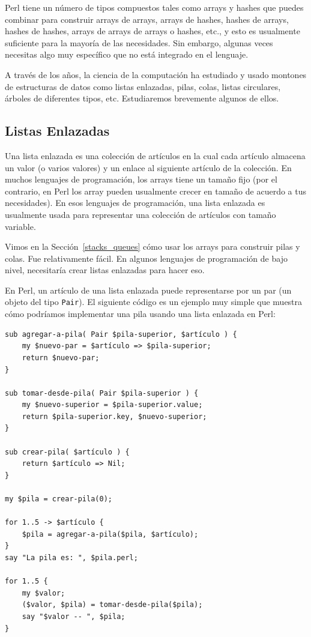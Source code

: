 Perl tiene un número de tipos compuestos tales como arrays
y hashes que puedes combinar para construir arrays de arrays,
arrays de hashes, hashes de arrays, hashes de hashes, arrays
de arrays de arrays o hashes, etc., y esto es usualmente 
suficiente para la mayoría de las necesidades.  Sin embargo,
algunas veces necesitas algo muy específico que no está
integrado en el lenguaje.

A través de los años, la ciencia de la computación ha estudiado
y usado montones de estructuras de datos como listas enlazadas,
pilas, colas, listas circulares, árboles de diferentes tipos, 
etc. Estudiaremos brevemente algunos de ellos.


\subsection{Listas Enlazadas}
\label{linked_list}

Una lista enlazada es una colección de artículos en la cual
cada artículo almacena un valor (o varios valores) y un enlace
al siguiente artículo de la colección. En muchos lenguajes de
programación, los arrays tiene un tamaño fijo (por el contrario,
en Perl los array pueden usualmente crecer en tamaño de acuerdo
a tus necesidades). En esos lenguajes de programación, una lista
enlazada es usualmente usada para representar una colección
de artículos con tamaño variable.

Vimos en la Sección~\ref{stacks_queues} cómo usar los arrays
para construir pilas y colas. Fue relativamente fácil. En algunos
lenguajes de programación de bajo nivel, necesitaría crear listas
enlazadas para hacer eso.

En Perl, un artículo de una lista enlazada puede representarse por 
un par (un objeto del tipo \verb|Pair|). El siguiente código es un 
ejemplo muy simple que muestra cómo podríamos implementar una pila 
usando una lista enlazada en Perl:

\begin{verbatim}
sub agregar-a-pila( Pair $pila-superior, $artículo ) {
    my $nuevo-par = $artículo => $pila-superior;
    return $nuevo-par;
}

sub tomar-desde-pila( Pair $pila-superior ) {
    my $nuevo-superior = $pila-superior.value;
    return $pila-superior.key, $nuevo-superior;
}

sub crear-pila( $artículo ) {
    return $artículo => Nil;
}

my $pila = crear-pila(0);

for 1..5 -> $artículo {
    $pila = agregar-a-pila($pila, $artículo);
}
say "La pila es: ", $pila.perl;

for 1..5 {
    my $valor;
    ($valor, $pila) = tomar-desde-pila($pila);
    say "$valor -- ", $pila;    
}
\end{verbatim}

